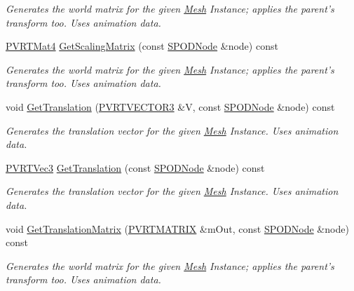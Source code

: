\begin{DoxyCompactItemize}
\begin{DoxyCompactList}\small\item\em Generates the world matrix for the given \hyperlink{class_mesh}{Mesh} Instance; applies the parent's transform too. Uses animation data. \end{DoxyCompactList}\item 
\hyperlink{struct_p_v_r_t_mat4}{P\+V\+R\+T\+Mat4} \hyperlink{class_c_p_v_r_t_model_p_o_d_a0c2e6579a636c6ba2c63b99f5b895c8a}{Get\+Scaling\+Matrix} (const \hyperlink{struct_s_p_o_d_node}{S\+P\+O\+D\+Node} \&node) const 
\begin{DoxyCompactList}\small\item\em Generates the world matrix for the given \hyperlink{class_mesh}{Mesh} Instance; applies the parent's transform too. Uses animation data. \end{DoxyCompactList}\item 
void \hyperlink{class_c_p_v_r_t_model_p_o_d_a1523d8ed385a093a210e229b3e81a0bb}{Get\+Translation} (\hyperlink{struct_p_v_r_t_v_e_c_t_o_r3f}{P\+V\+R\+T\+V\+E\+C\+T\+O\+R3} \&V, const \hyperlink{struct_s_p_o_d_node}{S\+P\+O\+D\+Node} \&node) const 
\begin{DoxyCompactList}\small\item\em Generates the translation vector for the given \hyperlink{class_mesh}{Mesh} Instance. Uses animation data. \end{DoxyCompactList}\item 
\hyperlink{struct_p_v_r_t_vec3}{P\+V\+R\+T\+Vec3} \hyperlink{class_c_p_v_r_t_model_p_o_d_ad0b83b6db7fef5859f8546a0e21b7b70}{Get\+Translation} (const \hyperlink{struct_s_p_o_d_node}{S\+P\+O\+D\+Node} \&node) const 
\begin{DoxyCompactList}\small\item\em Generates the translation vector for the given \hyperlink{class_mesh}{Mesh} Instance. Uses animation data. \end{DoxyCompactList}\item 
void \hyperlink{class_c_p_v_r_t_model_p_o_d_a5b9cdd65e3f36c6fe3c0a6937892d506}{Get\+Translation\+Matrix} (\hyperlink{class_p_v_r_t_m_a_t_r_i_xf}{P\+V\+R\+T\+M\+A\+T\+R\+I\+X} \&m\+Out, const \hyperlink{struct_s_p_o_d_node}{S\+P\+O\+D\+Node} \&node) const 
\begin{DoxyCompactList}\small\item\em Generates the world matrix for the given \hyperlink{class_mesh}{Mesh} Instance; applies the parent's transform too. Uses animation data. \end{DoxyCompactList}\item 

\end{DoxyCompactItemize}
